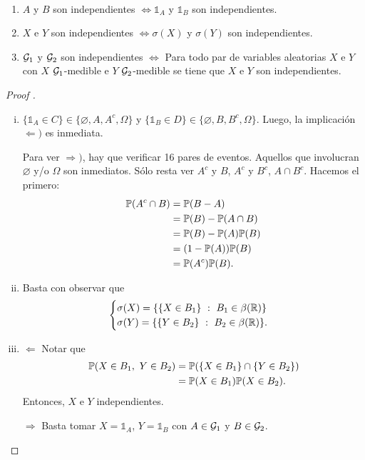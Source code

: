 \begin{prop}~
	\begin{enumerate}
		\item $A$ y $B$ son independientes $\iff \mathds{1}_{A}$ y $\mathds{1}_{B}$ son independientes.

		\item $X$ e $Y$ son independientes $\iff \sigma(X)$ y $\sigma(Y)$ son independientes.

		\item $\mathcal{G}_{1}$ y $\mathcal{G}_{2}$ son independientes $\iff$ Para todo par de variables aleatorias $X$ e $Y$ con $X$ $\mathcal{G}_{1}$-medible e $Y$ $\mathcal{G}_{2}$-medible se tiene que $X$ e $Y$ son independientes.
	\end{enumerate}
\end{prop}
\begin{proof}[Proof ]
	\begin{enumerate}[i)]
		\item $\{\mathds{1}_{A} \in C\} \in \{\varnothing, A, A^{c}, \Omega\}$ y $\{\mathds{1}_{B} \in D\} \in \{\varnothing, B, B^{c}, \Omega\}$. Luego, la implicación $\Leftarrow)$ es inmediata. \par
		Para ver $\Rightarrow)$, hay que verificar 16 pares de eventos. Aquellos que involucran $\varnothing$ y/o $\Omega$ son inmediatos. Sólo resta ver $A^{c}$ y $B$, $A^{c}$ y $B^{c}$, $A \cap B^{c}$. Hacemos el primero:
		\begin{align*}
			\mathbb{P}(A^{c} \cap B) &= \mathbb{P}(B - A) \\
			&= \mathbb{P}(B) - \mathbb{P}(A \cap B) \\
			&= \mathbb{P}(B) - \mathbb{P}(A) \mathbb{P}(B) \\
			&= (1 - \mathbb{P}(A)) \mathbb{P}(B) \\
			&= \mathbb{P}(A^{c}) \mathbb{P}(B)
		.\end{align*}

		\item Basta con observar que 
		\[ \begin{cases}
			\sigma(X) = \{\{X \in B_{1}\} \ : \ B_{1} \in \beta(\mathbb{R})\} \\
			\sigma(Y) = \{\{Y \in B_{2}\} \ : \ B_{2} \in \beta(\mathbb{R})\}.
		\end{cases} \]

		\item $\boxed{\Leftarrow}$ Notar que
		\begin{align*}
			\mathbb{P}(X \in B_{1},\ Y \in B_{2}) &= \mathbb{P}(\{X \in B_{1}\} \cap \{Y \in B_{2}\}) \\
			&= \mathbb{P}(X \in B_{1}) \mathbb{P}(X \in B_{2})
		.\end{align*}
		Entonces, $X$ e $Y$ independientes. \par
		$\boxed{\Rightarrow}$ Basta tomar $X = \mathds{1}_{A}$, $Y = \mathds{1}_{B}$ con $A \in \mathcal{G}_{1}$ y $B \in \mathcal{G}_{2}$.
	\end{enumerate}
\end{proof}

